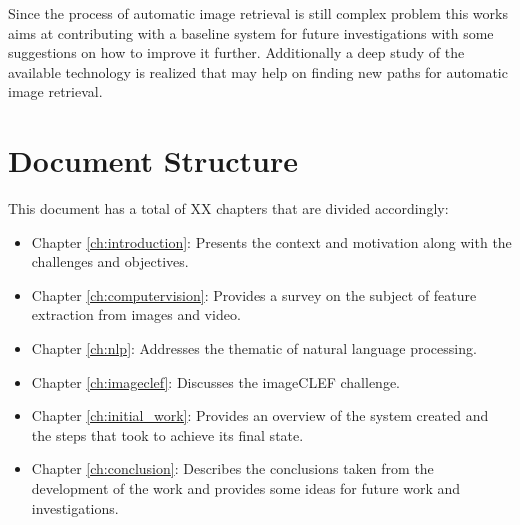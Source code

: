 Since the process of automatic image retrieval is still complex problem this works aims at contributing with a baseline system for future investigations with some suggestions on how to improve it further. Additionally a deep study of the available technology is realized that may help on finding new paths for automatic image retrieval.


\section{Document Structure}
This document has a total of XX chapters that are divided accordingly:




\begin{itemize}
  \item Chapter \ref{ch:introduction}: Presents the context and motivation along with the challenges and objectives.
  \item Chapter \ref{ch:computervision}: Provides a survey on the subject of feature extraction from images and video.
  \item Chapter \ref{ch:nlp}: Addresses the thematic of natural language processing.
  \item Chapter \ref{ch:imageclef}: Discusses the imageCLEF challenge.
  \item Chapter \ref{ch:initial_work}: Provides an overview of the system created and the steps that took to achieve its final state.
  \item Chapter \ref{ch:conclusion}: Describes the conclusions taken from the development of the work and provides some ideas for future work and investigations.
  
 
 
\end{itemize}

